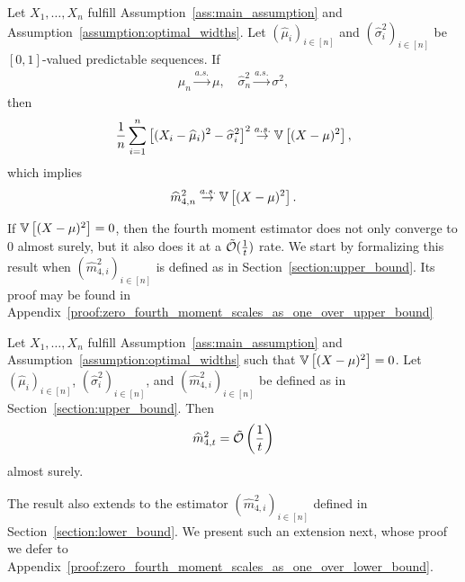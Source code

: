 \begin{proposition} \label{proposition:fourth_moment_as_convergence}
    Let $X_1, \ldots, X_n$ fulfill Assumption~\ref{ass:main_assumption} and Assumption~\ref{assumption:optimal_widths}. Let $(\widehat\mu_i)_{i \in [n]}$ and $(\widehat\sigma_i^2)_{i \in [n]}$ be $[0, 1]$-valued predictable sequences. If
    \begin{align*}
        \widehat\mu_n \stackrel{a.s.}{\to} \mu, \quad \widehat\sigma_n^2  \stackrel{a.s.}{\to} \sigma^2,
    \end{align*}
    then
    \begin{align*}
        \frac{1}{n} \sum_{i = 1}^n \left[ (X_i - \widehat\mu_i)^2 - \widehat\sigma_i^2 \right]^2 \stackrel{a.s.}{\to} \mathbb{V} \left[(X-\mu)^2 \right],
    \end{align*}
    which implies
    \begin{align*}
        \widehat m_{4, n}^2 \stackrel{a.s.}{\to} \mathbb{V} \left[(X-\mu)^2 \right].
    \end{align*}
\end{proposition}

If $\mathbb{V} \left[(X-\mu)^2 \right] = 0$, then the fourth moment estimator does not only converge to $0$ almost surely, but it also does it at a $\tilde{\mathcal{O}} (\frac{1}{t})$ rate. We start by formalizing this result when  $(\widehat m_{4, i}^2)_{i \in [n]}$ is defined as in Section~\ref{section:upper_bound}. Its proof may be found in Appendix~\ref{proof:zero_fourth_moment_scales_as_one_over_upper_bound}  

\begin{proposition} \label{proposition:zero_fourth_moment_scales_as_one_over_upper_bound}
    Let $X_1, \ldots, X_n$ fulfill Assumption~\ref{ass:main_assumption} and Assumption~\ref{assumption:optimal_widths} such that $\mathbb{V} \left[(X-\mu)^2 \right] = 0$. Let $(\widehat\mu_i)_{i \in [n]}$, $(\widehat\sigma_i^2)_{i \in [n]}$, and $(\widehat m_{4, i}^2)_{i \in [n]}$ be defined as in Section~\ref{section:upper_bound}. Then
    \begin{align*}
        \widehat m_{4, t}^2 = \tilde{\mathcal{O}} \left( \frac{1}{t}\right)
    \end{align*}
    almost surely.
\end{proposition}

The result also extends to the estimator $(\widehat m_{4, i}^2)_{i \in [n]}$ defined in Section~\ref{section:lower_bound}. We present such an extension next, whose proof we defer to Appendix~\ref{proof:zero_fourth_moment_scales_as_one_over_lower_bound}.

